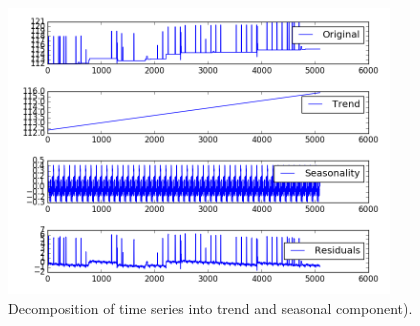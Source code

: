 \documentclass[12pt]{article}
\begin{document}
\begin{figure}
\includegraphics[width=0.9\textwidth]{11505/decomposition.png}
\caption{Decomposition of time series into trend and seasonal component).} \label{fg:decomp}
\end{figure}
\end{document}

